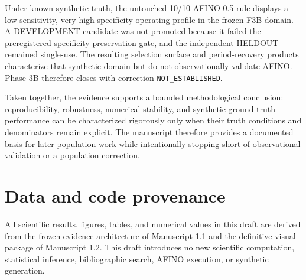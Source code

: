 \documentclass[11pt,a4paper]{article}
\begin{document}
Under known synthetic truth, the untouched 10/10 AFINO 0.5 rule displays a low-sensitivity, very-high-specificity operating profile in the frozen F3B domain. A DEVELOPMENT candidate was not promoted because it failed the preregistered specificity-preservation gate, and the independent HELDOUT remained single-use. The resulting selection surface and period-recovery products characterize that synthetic domain but do not observationally validate AFINO. Phase 3B therefore closes with correction \texttt{NOT\_ESTABLISHED}.

Taken together, the evidence supports a bounded methodological conclusion: reproducibility, robustness, numerical stability, and synthetic-ground-truth performance can be characterized rigorously only when their truth conditions and denominators remain explicit. The manuscript therefore provides a documented basis for later population work while intentionally stopping short of observational validation or a population correction.

\section*{Data and code provenance}
All scientific results, figures, tables, and numerical values in this draft are derived from the frozen evidence architecture of Manuscript 1.1 and the definitive visual package of Manuscript 1.2. This draft introduces no new scientific computation, statistical inference, bibliographic search, AFINO execution, or synthetic generation.

\printbibliography
\end{document}
